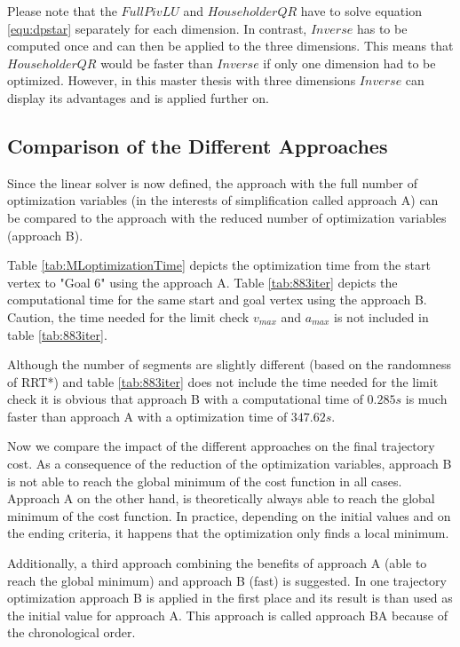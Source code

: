 Please note that the $FullPivLU$ and $HouseholderQR$ have to solve equation \ref{equ:dpstar} separately for each dimension. In contrast, $Inverse$ has to be computed once and can then be applied to the three dimensions. This means that $HouseholderQR$ would be faster than $Inverse$ if only one dimension had to be optimized. However, in this master thesis with three dimensions $Inverse$ can display its advantages and is applied further on. 

\subsection{Comparison of the Different Approaches}\label{sec:CompDiffApp}

Since the linear solver is now defined, the approach with the full number of optimization variables (in the interests of simplification called approach A) can be compared to the approach with the reduced number of optimization variables (approach B).\newline

Table \ref{tab:MLoptimizationTime} depicts the optimization time from the start vertex to "Goal 6" using the approach A. Table \ref{tab:883iter} depicts the computational time for the same start and goal vertex using the approach B. Caution, the time needed for the limit check $v_{max}$ and $a_{max}$ is not included in table \ref{tab:883iter}. 

Although the number of segments are slightly different (based on the randomness of RRT*) and table \ref{tab:883iter} does not include the time needed for the limit check it is obvious that approach B with a computational time of $0.285s$ is much faster than approach A with a optimization time of $347.62s$.\newline 

Now we compare the impact of the different approaches on the final trajectory cost.
As a consequence of the reduction of the optimization variables, approach B is not able to reach the global minimum of the cost function in all cases. Approach A on the other hand, is theoretically always able to reach the global minimum of the cost function. In practice, depending on the initial values and on the ending criteria, it happens that the optimization only finds a local minimum. \newline

Additionally, a third approach combining the benefits of approach A (able to reach the global minimum) and approach B (fast) is suggested. In one trajectory optimization approach B is applied in the first place and its result is than used as the initial value for approach A. This approach is called approach BA because of the chronological order. \newline

